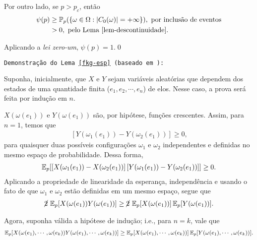 \par Por outro lado, se $p > p_c$, então
\begin{align*}
	\psi(p) &\geq \operatorname{\mathbb{P}}_p(\{\omega \in \Omega : |C_0(\omega)| = +\infty\}), \text{ por inclusão de eventos} \\
			&> 0, \text{ pelo Lema \ref{lem-descontinuidade}.}
\end{align*}
\par Aplicando a \textit{lei zero-um}, $\psi(p) = 1$.\hspace{\fill}\qed
\vspace{12pt}

\par \texttt{Demonstração do Lema \ref{fkg-esp} (baseado em \cite{grimmett1999percolation}):}

\par Suponha, inicialmente, que $X$ e $Y$ sejam variáveis aleatórias que dependem dos estados de uma quantidade finita ($e_1, e_2, \cdots, e_n$) de elos. Nesse caso, a prova será feita por indução em $n$.

\par $X(\omega(e_1))$ e $Y(\omega(e_1))$ são, por hipótese, funções crescentes. Assim, para $n = 1$, temos que
\begin{align*}
[X(\omega_1(e_1)) - X(\omega_2(e_1))]\,[Y(\omega_1(e_1)) - Y(\omega_2(e_1))] \geq 0,
\end{align*}
para quaisquer duas possíveis configurações $\omega_1$ e $\omega_2$ independentes e definidas no mesmo espaço de probabilidade. Dessa forma,
\begin{align*}
\operatorname{\mathbb{E}}_p[[X(\omega_1(e_1)) - X(\omega_2(e_1))]\,[Y(\omega_1(e_1)) - Y(\omega_2(e_1))]] \geq 0.
\end{align*}
Aplicando a propriedade de linearidade da esperança, independência e usando o fato de que $\omega_1$ e $\omega_2$ estão definidas em um mesmo espaço, segue que
\begin{align*}
\cancel{2}\,\operatorname{\mathbb{E}}_p[X(\omega(e_1))Y(\omega(e_1))] \geq  \cancel{2}\,\operatorname{\mathbb{E}}_p[X(\omega(e_1))] \operatorname{\mathbb{E}}_p[Y(\omega(e_1))].
\end{align*}

\par Agora, suponha válida a hipótese de indução; i.e., para $n = k$, vale que
\begin{align*}
\operatorname{\mathbb{E}}_p[X(\omega(e_1), \cdots, \omega(e_k))Y(\omega(e_1), \cdots, \omega(e_k))] \geq \operatorname{\mathbb{E}}_p[X(\omega(e_1), \cdots, \omega(e_k))] \operatorname{\mathbb{E}}_p[Y(\omega(e_1), \cdots, \omega(e_k))].
\end{align*}

